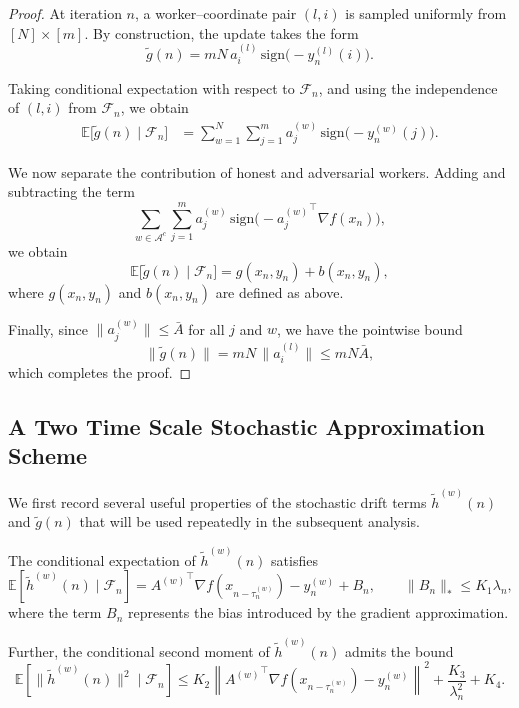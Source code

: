 \documentclass{article}
\begin{document}
\begin{proof}
At iteration $n$, a worker--coordinate pair $(l,i)$ is sampled uniformly from 
$[N]\times[m]$. By construction, the update takes the form
\[
\widetilde g(n)
= m N \, a_i^{(l)}\,\mathrm{sign}\!\bigl(-y_n^{(l)}(i)\bigr).
\]

Taking conditional expectation with respect to $\mathcal{F}_n$, and using the independence of $(l,i)$ from $\mathcal{F}_n$, we obtain
\[
\begin{aligned}
\mathbb{E}\big[\widetilde g(n)\mid\mathcal{F}_n\big]
&= \sum_{w=1}^N \sum_{j=1}^m 
a_j^{(w)} \,\mathrm{sign}\!\bigl(-y_n^{(w)}(j)\bigr).
\end{aligned}
\]

We now separate the contribution of honest and adversarial workers. Adding and subtracting the term
\[
\sum_{w\in\mathcal{A}^c} \sum_{j=1}^m 
a_j^{(w)} \,\mathrm{sign}\!\big(-{a_j^{(w)}}^\top\nabla f(x_n)\big),
\]
we obtain
\[
\mathbb{E}\big[\widetilde g(n)\mid\mathcal{F}_n\big]
= g(x_n,y_n) + b(x_n,y_n),
\]
where $g(x_n,y_n)$ and $b(x_n,y_n)$ are defined as above.

Finally, since $\|a_j^{(w)}\|\le \bar A$ for all $j$ and $w$, we have the pointwise bound
\[
\|\widetilde g(n)\|
= m N \,\|a_i^{(l)}\|
\le m N \bar A,
\]
which completes the proof.
\end{proof}

\subsection{A Two Time Scale Stochastic Approximation Scheme}
We first record several useful properties of the stochastic drift terms
$\widetilde{h}^{(w)}(n)$ and $\widetilde{g}(n)$ that will be used repeatedly in the subsequent analysis.

The conditional expectation of $\widetilde{h}^{(w)}(n)$ satisfies
\begin{equation}
\mathbb{E}\!\left[
\widetilde{h}^{(w)}(n)\mid \mathcal{F}_n
\right]
=
{A^{(w)}}^\top \nabla f(x_{n-\tau_n^{(w)}})
-
y_n^{(w)}
+
B_n,
\qquad
\|B_n\|_\ast \le K_1 \lambda_n ,
\label{hwn}
\end{equation}
where the term $B_n$ represents the bias introduced by the gradient approximation.

Further, the conditional second moment of
$\widetilde{h}^{(w)}(n)$ admits the bound
\begin{equation}
\mathbb{E}\!\left[
\|\widetilde{h}^{(w)}(n)\|^2
\mid \mathcal{F}_n
\right]
\le
K_2
\left\|
{A^{(w)}}^\top \nabla f(x_{n-\tau_n^{(w)}})
-
y_n^{(w)}
\right\|^2
+
\frac{K_3}{\lambda_n^2}
+
K_4 .
\label{C2M}
\end{equation}
\end{document}
